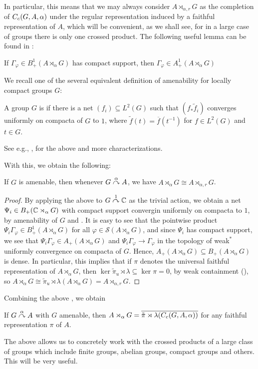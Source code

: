 In particular, this means that we may always consider $A \rtimes_{\alpha,r}G$ as the completion of $C_c(G,A,\alpha)$ under the regular representation induced by a faithful representation of $A$, which will be convenient, as we shall see, for in a large case of groups there is only one crossed product. The following useful lemma can be found in \cite[Lemma 7.7.6]{pedersenalgauto}:
\begin{lemma}
If $\Gamma_\varphi \in B_+^1(A \rtimes_\alpha G)$ has compact support, then $\Gamma_\varphi \in A_+^1(A \rtimes_\alpha G)$
\label{crossed:compactposdef}
\end{lemma}

We recall one of the several equivalent definition of amenability for locally compact groups $G$:
\begin{definition}
A group $G$ is  if there is a net $(f_i) \subseteq L^2(G)$ such that $(f_ \ast \tilde f_i)$ converges uniformly on compacta of $G$ to $1$, where $\tilde f (t) = \overline f(t^{-1})$ for $f \in L^2(G)$ and $t \in G$.
\end{definition}
See e.g., \cite[Appendix G]{bekka2008kazhdan}, \cite[Proposition 7.3.7 and 7.3.8]{pedersenalgauto} for the above and more characterizations. 

With this, we obtain the following:
\begin{theorem}
If $G$ is amenable, then whenever $G \stackrel{\alpha}{\curvearrowright} A$, we have $A \rtimes_\alpha G \cong A \rtimes_{\alpha,r}G$.
\label{cross:amenable}
\end{theorem}
\begin{proof}
By applying the above to $G \stackrel{1}{\curvearrowright} \mathbb{C}$ as the trivial action, we obtain a net $\Psi_i \in B_{+}(\mathbb{C} \rtimes_\alpha G)$ with compact support convergin uniformly on compacta to $1$, by amenability of $G$ and \cite[Lemma 7.2.4]{pedersenalgauto}. It is easy to see that the pointwise product $\Psi_i \Gamma_\varphi \in B_+^1(A \rtimes_\alpha G)$ for all $\varphi \in \mathcal{S}(A \rtimes_\alpha G)$, and since $\Psi_i$ has compact support, we see that $\Psi_i \Gamma_\varphi \in A_+(A \rtimes_\alpha G)$ and $\Psi_i \Gamma_\varphi \to \Gamma_\varphi$ in the topology of weak$^*$ uniformly convergence on compacta of $G$. Hence, $A_+(A \rtimes_\alpha G) \subseteq B_+(A \rtimes_\alpha G)$ is dense. In particular, this implies that if $\pi$ denotes the universal faithful representation of $A \rtimes_\alpha G$, then $\ker \tilde \pi_u \rtimes \lambda \subseteq \ker \pi = 0$, by weak containment (\cite[80]{dixmier1969c}), so $A \rtimes_\alpha G \cong \tilde \pi_u \rtimes \lambda( A \rtimes_\alpha G) = A \rtimes_{\alpha,r}G$.
\end{proof}
Combining the above , we obtain
\begin{corollary}
If $G \stackrel{\alpha}{\curvearrowright} A$ with $G$ amenable, then $A \rtimes_\alpha G = \overline{\tilde \pi \rtimes \lambda (C_c(G,A,\alpha))}$ for any faithful representation $\pi$ of $A$.
\end{corollary}
The above allows us to concretely work with the crossed products of a large class of groups which include finite groups, abelian groups, compact groups and others. This will be very useful.

